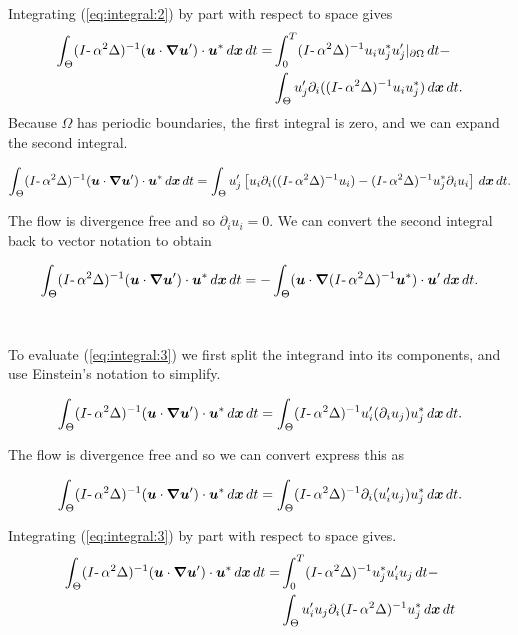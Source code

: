 \noindent Integrating (\ref{eq:integral:2}) by part with respect to space gives
\begin{subequations}
\begin{align*}
\int_{\Theta} (I\text{-}\,\alpha^2\Delta)^{-1}(\boldsymbol u\cdot{\boldsymbol \nabla}\boldsymbol u')\cdot\boldsymbol u^* \,d\boldsymbol x\,dt = &\int_0^T (I\text{-}\,\alpha^2\Delta)^{-1} u_i u_j^* u'_j |_{\partial \Omega} \,dt - \\ &\int_{\Theta}  u'_j \partial_i((I\text{-}\,\alpha^2\Delta)^{-1} u_i u_j^*) \,d\boldsymbol x\,dt.
\end{align*}
\end{subequations}
\noindent Because $\Omega$ has periodic boundaries, the first integral is zero, and we can expand the second integral.

$$\int_{\Theta} (I\text{-}\,\alpha^2\Delta)^{-1}(\boldsymbol u\cdot{\boldsymbol \nabla}\boldsymbol u')\cdot\boldsymbol u^* \,d\boldsymbol x\,dt = \int_{\Theta} u'_j\left[ u_i\partial_i((I\text{-}\,\alpha^2\Delta)^{-1} u_i) - (I\text{-}\,\alpha^2\Delta)^{-1} u_j^*\partial_i u_i \right] \,d\boldsymbol x\,dt.$$

\noindent The flow is divergence free and so $\partial_i u_i = 0$. We can convert the second integral back to vector notation to obtain

$$\int_{\Theta}(I\text{-}\,\alpha^2\Delta)^{-1}(\boldsymbol u\cdot{\boldsymbol \nabla}\boldsymbol u')\cdot \boldsymbol u^* \,d\boldsymbol x\,dt = -\int_{\Theta} (\boldsymbol u\cdot{\boldsymbol \nabla}(I\text{-}\,\alpha^2\Delta)^{-1}\boldsymbol u^*)\cdot \boldsymbol u' \,d\boldsymbol x\,dt.$$
\\~\\
\noindent To evaluate (\ref{eq:integral:3}) we first split the integrand into its components, and use Einstein's notation to simplify.

$$\int_{\Theta}(I\text{-}\,\alpha^2\Delta)^{-1}(\boldsymbol u\cdot{\boldsymbol \nabla}\boldsymbol u')\cdot \boldsymbol u^* \,d\boldsymbol x\,dt = \int_{\Theta}(I\text{-}\,\alpha^2\Delta)^{-1}u'_i(\partial_i u_j) u_j^* \,d\boldsymbol x\,dt.$$

\noindent The flow is divergence free and so we can convert express this as

$$\int_{\Theta}(I\text{-}\,\alpha^2\Delta)^{-1}(\boldsymbol u\cdot{\boldsymbol \nabla}\boldsymbol u')\cdot \boldsymbol u^* \,d\boldsymbol x\,dt = \int_{\Theta}(I\text{-}\,\alpha^2\Delta)^{-1}\partial_i(u'_i u_j) u_j^* \,d\boldsymbol x\,dt.$$

\noindent Integrating (\ref{eq:integral:3}) by part with respect to space gives.
\begin{subequations}
\begin{align*}
\int_{\Theta}(I\text{-}\,\alpha^2\Delta)^{-1}(\boldsymbol u\cdot{\boldsymbol \nabla}\boldsymbol u')\cdot \boldsymbol u^* \,d\boldsymbol x\,dt = &\int_0^T (I\text{-}\,\alpha^2\Delta)^{-1} u_j^* u'_i u_j \,dt - \\ 
&\int_{\Theta} u'_i u_j \partial_i(I\text{-}\,\alpha^2\Delta)^{-1} u_j^* \,d\boldsymbol x\,dt
\end{align*}
\end{subequations}

